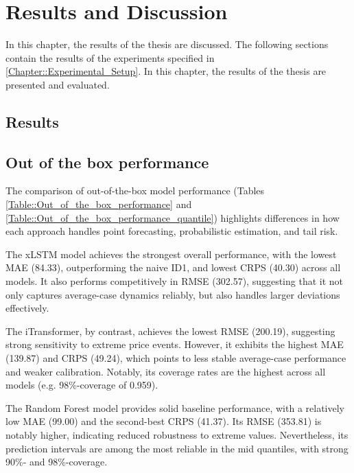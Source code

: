 \documentclass[class=scrbook, crop=false]{standalone}
\begin{document}
\chapter{Results and Discussion} %
\label{Chapter::Results and Discussion}
In this chapter, the results of the thesis are discussed. The following sections contain the results of the experiments specified in \ref{Chapter::Experimental_Setup}.                   
    In this chapter, the results of the thesis are presented and evaluated.%

\section{Results}
\label{Section::Results}

\section{Out of the box performance}

The comparison of out-of-the-box model performance (Tables \ref{Table::Out_of_the_box_performance} and \ref{Table::Out_of_the_box_performance_quantile}) highlights differences in how each approach handles point forecasting, probabilistic estimation, and tail risk.

The xLSTM model achieves the strongest overall performance, with the lowest MAE (84.33), outperforming the naive ID1, and lowest CRPS (40.30) across all models. It also performs competitively in RMSE (302.57), suggesting that it not only captures average-case dynamics reliably, but also handles larger deviations effectively.

The iTransformer, by contrast, achieves the lowest RMSE (200.19), suggesting strong sensitivity to extreme price events. However, it exhibits the highest MAE (139.87) and CRPS (49.24), which points to less stable average-case performance and weaker calibration. Notably, its coverage rates are the highest across all models (e.g. 98\%-coverage of 0.959).

The Random Forest model provides solid baseline performance, with a relatively low MAE (99.00) and the second-best CRPS (41.37). Its RMSE (353.81) is notably higher, indicating reduced robustness to extreme values. Nevertheless, its prediction intervals are among the most reliable in the mid quantiles, with strong 90\%- and 98\%-coverage.
\end{document}
